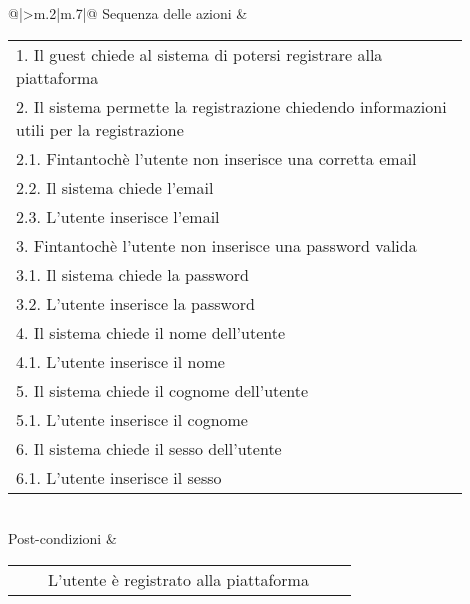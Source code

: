\begin{longtable}{@{}|>{\centering\arraybackslash}m{.2\textwidth}|m{.7\textwidth}|@{}}
		Sequenza delle azioni & \begin{tabular}{m{0.9\linewidth}}\hspace{0.0cm}1. Il guest chiede al sistema di potersi registrare alla piattaforma\\\hspace{0.0cm}2. Il sistema permette la registrazione chiedendo informazioni utili per la registrazione\\\hspace{0.5cm}\hspace{0.0cm}2.1. Fintantochè l'utente non inserisce una corretta email\\\hspace{0.5cm}\hspace{0.0cm}2.2. Il sistema chiede l'email\\\hspace{0.5cm}\hspace{0.0cm}2.3. L'utente inserisce l'email\\\hspace{0.0cm}3. Fintantochè l'utente non inserisce una password valida\\\hspace{0.5cm}\hspace{0.0cm}3.1. Il sistema chiede la password\\\hspace{0.5cm}\hspace{0.0cm}3.2. L'utente inserisce la password\\\hspace{0.0cm}4. Il sistema chiede il nome dell'utente\\\hspace{0.5cm}\hspace{0.0cm}4.1. L'utente inserisce il nome\\\hspace{0.0cm}5. Il sistema chiede il cognome dell'utente\\\hspace{0.5cm}\hspace{0.0cm}5.1. L'utente inserisce il cognome\\\hspace{0.0cm}6. Il sistema chiede il sesso dell'utente\\\hspace{0.5cm}\hspace{0.0cm}6.1. L'utente inserisce il sesso\\\end{tabular}\\
		Post-condizioni & \begin{tabular}{m{0.9\linewidth}}~~\llap{\textbullet}~~L'utente è registrato alla piattaforma\\\end{tabular}\\

\end{longtable}
